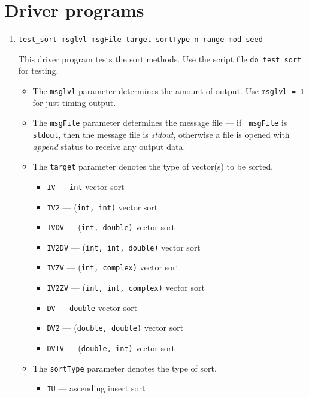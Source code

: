 \par
\section{Driver programs }
\label{section:Utilities:drivers}
\par
\begin{enumerate}
\item
\begin{verbatim}
test_sort msglvl msgFile target sortType n range mod seed
\end{verbatim}
This driver program tests the sort methods.
Use the script file {\tt do\_test\_sort} for testing.
\par
\begin{itemize}
\item
The {\tt msglvl} parameter determines the amount of output.
Use {\tt msglvl = 1} for just timing output.
\item
The {\tt msgFile} parameter determines the message file --- if {\tt
msgFile} is {\tt stdout}, then the message file is {\it stdout},
otherwise a file is opened with {\it append} status to receive any
output data.
\item
The {\tt target} parameter denotes the type of vector(s) to be
sorted.
\begin{itemize}
\item {\tt IV} --- {\tt int} vector sort
\item {\tt IV2} --- {(\tt int, int)} vector sort
\item {\tt IVDV} --- {(\tt int, double)} vector sort
\item {\tt IV2DV} --- {(\tt int, int, double)} vector sort
\item {\tt IVZV} --- {(\tt int, complex)} vector sort
\item {\tt IV2ZV} --- {(\tt int, int, complex)} vector sort
\item {\tt DV} --- {\tt double} vector sort
\item {\tt DV2} --- {(\tt double, double)} vector sort
\item {\tt DVIV} --- {(\tt double, int)} vector sort
\end{itemize}
\item
The {\tt sortType} parameter denotes the type of sort.
\begin{itemize}
\item {\tt IU} --- ascending insert sort

\end{itemize}
\end{itemize}
\end{enumerate}
